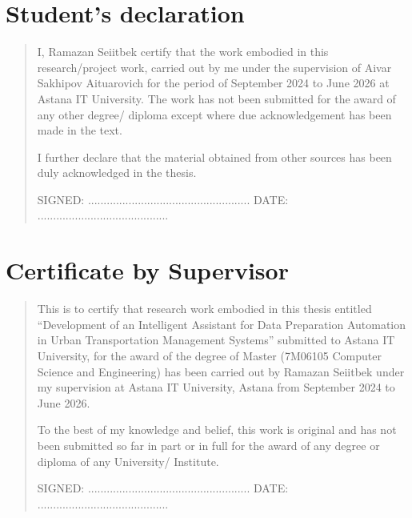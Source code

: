 %
%
\chapter{Student's declaration}
\begin{SingleSpace}
\begin{quote}
I, Ramazan Seiitbek certify that the work embodied in this research/project work, carried out by me under the supervision of Aivar Sakhipov Aituarovich for the period of September 2024 to June 2026 at Astana IT University.  The work has not been submitted for the award of any other degree/ diploma except where due acknowledgement has been made in the text.

I further declare that the material obtained from other sources has been duly acknowledged in the thesis.

\vspace{1.5cm}
\noindent
\hspace{-0.75cm}\textsc{SIGNED: .................................................... DATE: ..........................................}

\end{quote}
\end{SingleSpace}
\chapter{Certificate by Supervisor}
\begin{SingleSpace}
\begin{quote}
This is to certify that research work embodied in this thesis entitled ``Development of an Intelligent Assistant for Data Preparation Automation in Urban Transportation Management Systems'' submitted to Astana IT University, for the award of the degree of Master (7M06105 Computer Science and Engineering) has been carried out by Ramazan Seiitbek under my supervision at Astana IT University, Astana from September 2024 to June 2026.

To the best of my knowledge and belief, this work is original and has not been submitted so far in part or in full for the award of any degree or diploma of any University/ Institute.

\vspace{1.5cm}
\noindent
\hspace{-0.75cm}\textsc{SIGNED: .................................................... DATE: ..........................................}

\end{quote}
\end{SingleSpace}
\clearpage